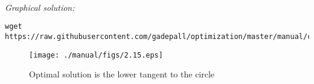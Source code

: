 \documentclass[journal,12pt,twocolumn]{IEEEtran}
\renewcommand\thesection{\arabic{section}}
\begin{document}
\begin{enumerate}[label=\thesection.\arabic*,ref=\thesection.\theenumi]
\solution 
%
\\
{\em Graphical solution:} 
%
%	
\begin{lstlisting}
wget https://raw.githubusercontent.com/gadepall/optimization/master/manual/codes/2.15.py
\end{lstlisting}

%
%
\begin{figure}[!ht]
\centering
\texttt{[image: ./manual/figs/2.15.eps]}
\caption{ Optimal solution is the lower tangent to the circle}
\label{fig.2.15}	
\end{figure}
%
\end{enumerate}
\end{document}
